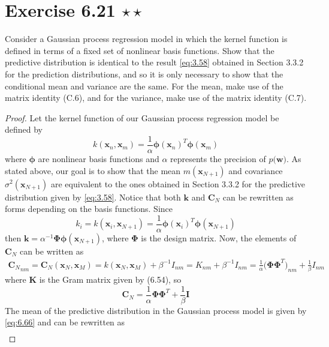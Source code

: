 \section*{Exercise 6.21 $\star \star$}
Consider a Gaussian process regression model in which
the kernel function is defined in terms of a fixed set of nonlinear basis
functions. Show that the predictive distribution is identical to the result \eqref{eq:3.58}
obtained in Section 3.3.2 for the prediction distributions, and so it is only necessary
to show that the conditional mean and variance are the same. For the mean, make
use of the matrix identity (C.6), and for the variance, make use of the
matrix identity (C.7).

\vspace{1em}

\begin{proof}
    Let the kernel function of our Gaussian process regression model be defined
    by 
    \[
        k(\mathbf{x}_n, \mathbf{x}_m) 
        = \frac{1}{\alpha} \bm{\phi}(\mathbf{x}_n)^T \bm{\phi}(\mathbf{x}_m)
    \] 
    where $\bm{\phi}$ are nonlinear basis functions and $\alpha$ represents
    the precision of $p(\mathbf{w)}$. As stated above, our goal
    is to show that the mean $m(\mathbf{x}_{N + 1})$ and covariance 
    $\sigma^2(\mathbf{x}_{N + 1})$ are equivalent to the ones obtained in Section 3.3.2
    for the predictive distribution given by \eqref{eq:3.58}. Notice that both $\mathbf{k}$ 
    and $\mathbf{C}_N$ can be rewritten as forms depending on the basis functions. Since
    \[
        k_i = k(\mathbf{x}_i, \mathbf{x}_{N + 1})
        = \frac{1}{\alpha} \bm{\phi}(\mathbf{x}_i)^T \bm{\phi}(\mathbf{x}_{N + 1})
    \]
    then $\mathbf{k} = \alpha^{-1} \bm{\Phi}\bm{\phi}(\mathbf{x}_{N + 1})$, where
    $\bm{\Phi}$ is the design matrix. Now, the elements of 
    $\mathbf{C}_N$ can be written as
    \begin{align*}
        {\mathbf{C}_N}_{nm} 
        = \mathbf{C}_N(\mathbf{x}_N, \mathbf{x}_M)
        = k(\mathbf{x}_N, \mathbf{x}_M) + \beta^{-1} I_{nm}
        = K_{nm} + \beta^{-1} I_{nm}
        = \frac{1}{\alpha} \big(\bm{\Phi}\bm{\Phi}^T\big)_{nm} + \frac{1}{\beta} I_{nm}
    \end{align*}
    where $\mathbf{K}$ is the Gram matrix given by (6.54), so 
    \[
        \mathbf{C}_N = \frac{1}{\alpha} \bm{\Phi}\bm{\Phi}^T + \frac{1}{\beta} \mathbf{I}
    \] 
    The mean of the predictive distribution in the Gaussian process model is given by 
    \eqref{eq:6.66} and can be rewritten as
    \begin{align*}

\end{align*}
\end{proof}
